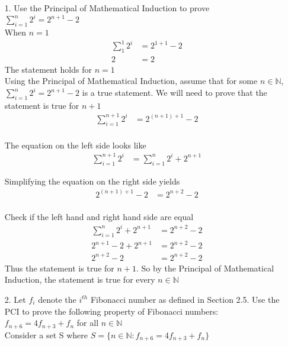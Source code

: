 \documentclass[a4paper,12pt]{article}
\begin{document}
    \begin{itemize}
      \item[1.] Use the Principal of Mathematical Induction to prove \\ $\sum^{n}_{i=1}2^i=2^{n+1}-2$
      \\
      When $n = 1$
      \begin{align*}
        \sum^{1}_{1}2^{i}&=2^{1+1}-2\\
        2 &= 2
      \end{align*}
      The statement holds for $n = 1$
      \\
      Using the Principal of Mathematical Induction, assume that for some $n \in \mathbb{N}$, $\sum^{n}_{i=1}2^i=2^{n+1}-2$ is a true statement. We will need to prove that the statement is true for $n+1$
      \begin{align*}
        \sum^{n+1}_{i=1}2^i&=2^{(n+1)+1}-2\\
      \end{align*}

      The equation on the left side looks like
      \begin{align*} 
        \sum^{n+1}_{i=1}2^i&=\sum^{n}_{i=1}2^{i} + 2^{n+1}
      \end{align*}

      Simplifying the equation on the right side yields
      \begin{align*}
        2^{(n+1)+1}-2&=2^{n+2}-2\\
      \end{align*}

      Check if the left hand and right hand side are equal
      \begin{align*}
        \sum^{n}_{i=1}2^{i} + 2^{n+1}&=2^{n+2}-2\\
        2^{n+1}-2 + 2^{n+1}&= 2^{n+2}-2\\
        2^{n+2}-2 &= 2^{n+2}-2
      \end{align*}
      Thus the statement is true for $n+1$. So by the Principal of Mathematical Induction, the statement is true for every $n \in \mathbb{N}$
      \item[2.] Let $f_i$ denote the $i^{th}$ Fibonacci number as defined in Section 2.5. Use the PCI to prove the following property of Fibonacci numbers: \\$f_{n+6}=4f_{n+3} + f_n$ for all $n \in \mathbb{N}$
      \\
      Consider a set S where $S = \{n \in \mathbb{N}: f_{n+6}=4f_{n+3} + f_{n}\}$
      \\


\end{itemize}
\end{document}
